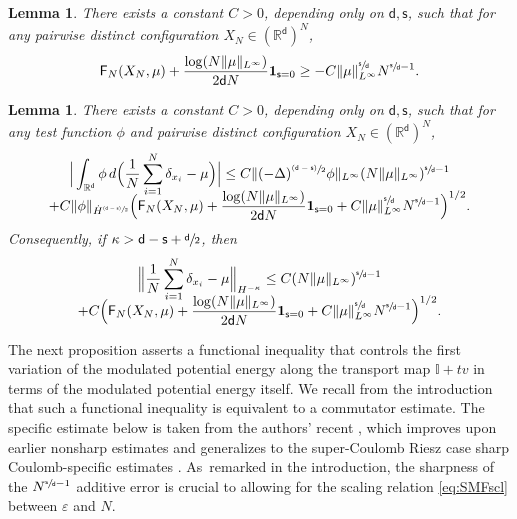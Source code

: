 \documentclass[10pt]{amsart}
\newcommand{\psfrac}[2]{\sfrac{(#1)}{#2}}
\theoremstyle{plain}
\newtheorem{lemma}[thm]{Lemma}
\theoremstyle{definition}
\newcommand{\I}{\mathbb{I}}
\newcommand{\R}{{\mathbb{R}}}
\let\vep\varepsilon
\let\ka\kappa
\let\ux X
\newcommand{\XN}{X_N}
\newcommand{\indic}{\mathbf{1}}
\newcommand{\Fr}{\mathsf{F}}
\renewcommand{\d}{\mathsf{d}}
\newcommand{\s}{\mathsf{s}}
\begin{document}
\begin{lemma}\label{lem:MPElb}
There exists a constant $C>0$, depending only on $\d,\s$, such that for any pairwise distinct configuration $\XN\in(\R^\d)^N$,
\begin{equation}\label{eq:MPElb}
\Fr_N(\ux_N,\mu) + \frac{\log(N\|\mu\|_{L^\infty})}{2\d N}\indic_{\s=0} \ge -C\|\mu\|_{L^\infty}^{\sfrac{\s}{\d}}N^{\sfrac{\s}{\d}-1}.
\end{equation}
\end{lemma}

\begin{lemma}\label{lem:MPEcoer}
There exists a constant $C>0$, depending only on $\d,\s$, such that for any test function $\phi$ and pairwise distinct configuration $\XN\in(\R^\d)^N$,\vspace*{-5pt}
\begin{multline*}
\Big|\int_{\R^\d}\phi \, d\Big(\frac1N\sum_{i=1}^N \delta_{x_i} - \mu\Big)\Big| \leq C\|(-\Delta)^{\psfrac{\d-\s}{2}}\phi\|_{L^\infty} (N\|\mu\|_{L^\infty})^{\sfrac{\s}{\d}-1} \\[-8pt]
+ C\|\phi\|_{\dot{H}^{\psfrac{\d-\s}{2}}}\Big(\Fr_N(\ux_N,\mu) + \frac{\log(N\|\mu\|_{L^\infty})}{2\d N}\indic_{\s=0} + C\|\mu\|_{L^\infty}^{\sfrac{\s}{\d}}N^{\sfrac{\s}{\d}-1}\Big)^{1/2}.
\end{multline*}
Consequently, if $\ka>\d-\s+\sfrac{\d}{2}$, then\vspace*{-5pt}
\begin{multline*}
\Bigl\|\frac1N\sum_{i=1}^N\delta_{x_i}-\mu\Bigr\|_{H^{-\ka}} \le C(N\|\mu\|_{L^\infty})^{\sfrac{\s}{\d}-1} \\[-8pt]
+ C \Big(\Fr_N(\ux_N,\mu) + \frac{\log(N\|\mu\|_{L^\infty})}{2\d N}\indic_{\s=0} + C\|\mu\|_{L^\infty}^{\sfrac{\s}{\d}} N^{\sfrac{\s}{\d}-1}\Big)^{1/2}.
\end{multline*}
\end{lemma}

The next proposition asserts a functional inequality that controls the first variation of the modulated potential energy along the transport map $\I+tv$ in terms of the modulated potential energy itself. We recall from the introduction that such a functional inequality is equivalent to a commutator estimate. The specific estimate below is taken from the authors' recent \cite[Th.\,1.1]{RS2022}, which improves upon earlier nonsharp estimates \cite{Duerinckx2016,Serfaty2020} and generalizes to the super-Coulomb Riesz case sharp Coulomb-specific estimates \cite{LS2018, Serfaty2023, Rosenzweig2021ne}. As~remarked in the introduction, the sharpness of the $N^{\sfrac{\s}{\d}-1}$ additive error is crucial to allowing for the scaling relation \eqref{eq:SMFscl} between $\vep$ and $N$.
\end{document}
